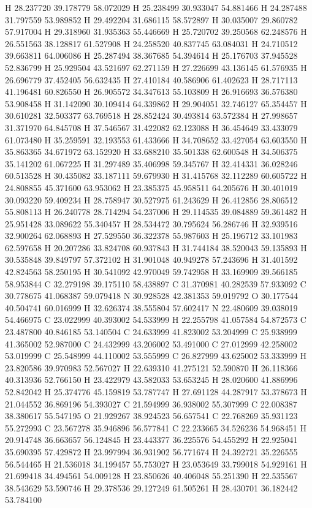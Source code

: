 \documentclass{article}
\begin{document}
H 28.237720 39.178779 58.072029 
H 25.238499 30.933047 54.881466 
H 24.287488 31.797559 53.989852 
H 29.492204 31.686115 58.572897 
H 30.035007 29.860782 57.917004 
H 29.318960 31.935363 55.446669 
H 25.720702 39.250568 62.248576 
H 26.551563 38.128817 61.527908 
H 24.258520 40.837745 63.084031 
H 24.710512 39.663811 64.006086 
H 25.287494 38.367685 54.394614 
H 25.176703 37.945528 52.836799 
H 25.929504 43.521697 62.271159 
H 27.226699 43.136145 61.576935 
H 26.696779 37.452405 56.632435 
H 27.410184 40.586906 61.402623 
H 28.717113 41.196481 60.826550 
H 26.905572 34.347613 55.103809 
H 26.916693 36.576380 53.908458 
H 31.142090 30.109414 64.339862 
H 29.904051 32.746127 65.354457 
H 30.610281 32.503377 63.769518 
H 28.852424 30.493814 63.572384 
H 27.998657 31.371970 64.845708 
H 37.546567 31.422082 62.123088 
H 36.454649 33.433079 61.073480 
H 35.259591 32.193553 61.433666 
H 34.708652 33.427054 63.603550 
H 35.863365 34.671972 63.152920 
H 33.688210 35.501338 62.600548 
H 34.506375 35.141202 61.067225 
H 31.297489 35.406998 59.345767 
H 32.414331 36.028246 60.513528 
H 30.435082 33.187111 59.679930 
H 31.415768 32.112289 60.605722 
H 24.808855 45.371600 63.953062 
H 23.385375 45.958511 64.205676 
H 30.401019 30.093220 59.409234 
H 28.758947 30.527975 61.243629 
H 26.412856 28.806512 55.808113 
H 26.240778 28.714294 54.237006 
H 29.114535 39.084889 59.361482 
H 25.951428 33.089622 55.340457 
H 28.534472 30.795624 56.286746 
H 32.939516 32.900264 62.068893 
H 27.529550 36.322378 55.987603 
H 25.196712 33.101983 62.597658 
H 20.207286 33.824708 60.937843 
H 31.744184 38.520043 59.135893 
H 30.535848 39.849797 57.372102 
H 31.901048 40.949278 57.243696 
H 31.401592 42.824563 58.250195 
H 30.541092 42.970049 59.742958 
H 33.169909 39.566185 58.953844 
C 32.279198 39.175110 58.438897 
C 31.370981 40.282539 57.933092 
C 30.778675 41.068387 59.079418 
N 30.928528 42.381353 59.019792 
O 30.177544 40.504741 60.016999 
H 32.626374 38.555804 57.602417 
N 22.480609 39.038019 54.466975 
C 23.022999 40.393002 54.533999 
H 22.255798 41.057584 54.872573 
C 23.487800 40.846185 53.140504 
C 24.633999 41.823002 53.204999 
C 25.938999 41.365002 52.987000 
C 24.432999 43.206002 53.491000 
C 27.012999 42.258002 53.019999 
C 25.548999 44.110002 53.555999 
C 26.827999 43.625002 53.333999 
H 23.820586 39.970983 52.567027 
H 22.639310 41.275121 52.590870 
H 26.118366 40.313936 52.766150 
H 23.422979 43.582033 53.653245 
H 28.020600 41.886996 52.842042 
H 25.374776 45.159819 53.787747 
H 27.691128 44.287917 53.378673 
H 21.044552 36.869196 54.393027 
C 21.594999 36.938002 55.307999 
C 22.008387 38.380617 55.547195 
O 21.929267 38.924523 56.657541 
C 22.768269 35.931123 55.272993 
C 23.567278 35.946896 56.577841 
C 22.233665 34.526236 54.968451 
H 20.914748 36.663657 56.124845 
H 23.443377 36.225576 54.455292 
H 22.925041 35.690395 57.429872 
H 23.997994 36.931902 56.771674 
H 24.392721 35.226555 56.544465 
H 21.536018 34.199457 55.753027 
H 23.053649 33.799018 54.929161 
H 21.699418 34.494561 54.009128 
H 23.850626 40.406048 55.251390 
H 22.535567 38.543629 53.590746 
H 29.378536 29.127249 61.505261 
H 28.430701 36.182442 53.784100 
~     
    
\end{document}
